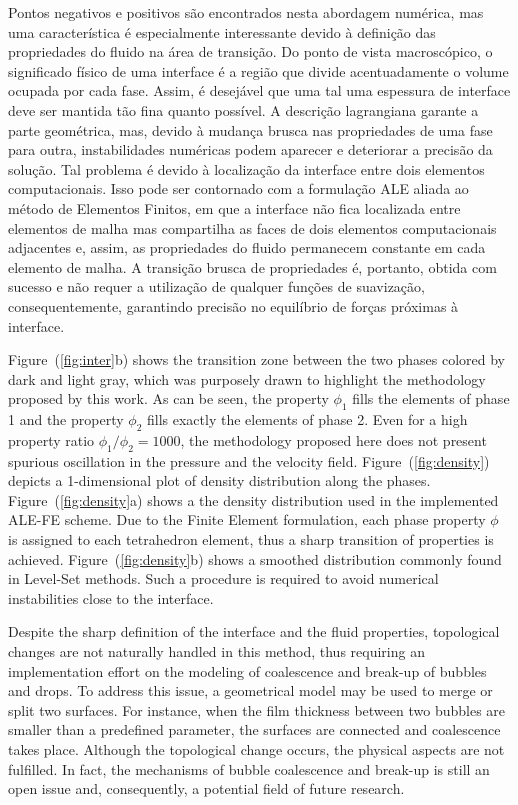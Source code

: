 \documentclass[a4paper,portuges]{article}
\begin{document}
Pontos negativos e positivos são encontrados nesta abordagem numérica,
mas uma característica é especialmente interessante devido à definição
das propriedades do fluido na área de transição. Do ponto de vista
macroscópico, o significado físico de uma interface é a região que
divide acentuadamente o volume ocupada por cada fase. Assim, é desejável
que uma tal uma espessura de interface deve ser mantida tão fina quanto
possível. A descrição lagrangiana garante a parte geométrica, mas,
devido à mudança brusca nas propriedades de uma fase para outra,
instabilidades numéricas podem aparecer e deteriorar a precisão da
solução. Tal problema é devido à localização da interface entre dois
elementos computacionais. Isso pode ser contornado com a formulação ALE
aliada ao método de Elementos Finitos, em que a interface não fica
localizada entre elementos de malha mas compartilha as faces de dois
elementos computacionais adjacentes e, assim, as propriedades do fluido
permanecem constante em cada elemento de malha. A transição brusca de
propriedades é, portanto, obtida com sucesso e não requer a utilização
de qualquer funções de suavização, consequentemente, garantindo precisão
no equilíbrio de forças próximas à interface.

Figure~(\ref{fig:inter}b) shows the transition zone between the two
phases colored by dark and light gray, which was purposely drawn to
highlight the methodology proposed by this work. As can be seen, the
property $\phi_1$ fills the elements of phase 1 and the property
$\phi_2$ fills exactly the elements of phase 2. Even for a high property
ratio $\phi_1 / \phi_2 = 1000$, the methodology proposed here does not
present spurious oscillation in the pressure and the velocity field.
Figure~(\ref{fig:density}) depicts a 1-dimensional plot of density
distribution along the phases. Figure~(\ref{fig:density}a) shows a the
density distribution used in the implemented ALE-FE scheme. Due to the
Finite Element formulation, each phase property $\phi$ is assigned to
each tetrahedron element, thus a sharp transition of properties is
achieved. Figure~(\ref{fig:density}b) shows a smoothed distribution
commonly found in Level-Set methods. Such a procedure is required to
avoid numerical instabilities close to the interface.

Despite the sharp definition of the interface and the fluid properties,
topological changes are not naturally handled in this method, thus
requiring an implementation effort on the modeling of coalescence and
break-up of bubbles and drops. To address this issue, a geometrical
model may be used to merge or split two surfaces. For instance, when the
film thickness between two bubbles are smaller than a predefined
parameter, the surfaces are connected and coalescence takes place.
Although the topological change occurs, the physical aspects are not
fulfilled. In fact, the mechanisms of bubble coalescence and break-up is
still an open issue and, consequently, a potential field of future
research. 
\end{document}
